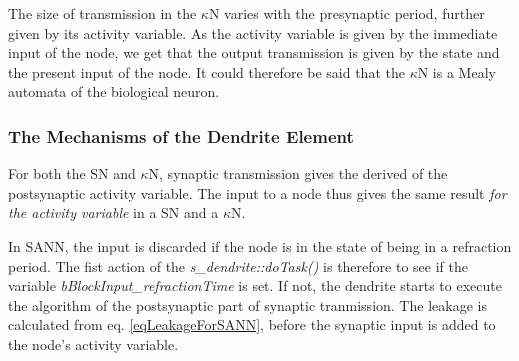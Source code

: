 		

		The size of transmission in the $\kappa$N varies with the presynaptic period, further given by its activity variable.
		As the activity variable is given by the immediate input of the node, we get that the output transmission is given by the state and the present input of the node.
		It could therefore be said that the $\kappa$N is a Mealy automata of the biological neuron.
	


		\subsubsection{The Mechanisms of the Dendrite Element}
		For both the SN and $\kappa$N, synaptic transmission gives the derived of the postsynaptic activity variable.
		The input to a node thus gives the same result \emph{for the activity variable} in a SN and a $\kappa$N.
		
		In SANN, the input is discarded if the node is in the state of being in a refraction period.
		The fist action of the \emph{s\_dendrite::doTask()} is therefore to see if the variable \emph{bBlockInput\_refractionTime} is set.
		If not, the dendrite starts to execute the algorithm of the postsynaptic part of synaptic tranmission.
		The leakage is calculated from eq. \eqref{eqLeakageForSANN}, before the synaptic input is added to the node's activity variable.

